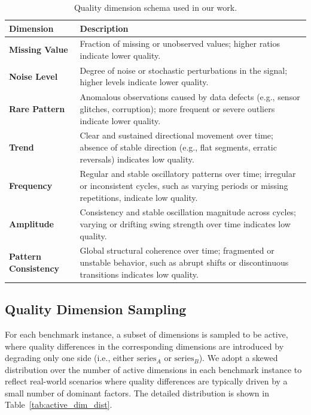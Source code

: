 \documentclass{article}
\begin{document}
\begin{table}[htbp!]
\centering
\caption{Quality dimension schema used in our work.}
\small
\setlength{\tabcolsep}{4pt}
\renewcommand{\arraystretch}{1.1}
\begin{tabular}{l p{10cm}}
\toprule
\textbf{Dimension} & \textbf{Description} \\
\midrule
\textbf{Missing Value} & Fraction of missing or unobserved values; higher ratios indicate lower quality. \\
\textbf{Noise Level} & Degree of noise or stochastic perturbations in the signal; higher levels indicate lower quality. \\
\textbf{Rare Pattern} & Anomalous observations caused by data defects (e.g., sensor glitches, corruption); more frequent or severe outliers indicate lower quality. \\
\textbf{Trend} & Clear and sustained directional movement over time; absence of stable direction (e.g., flat segments, erratic reversals) indicates low quality. \\
\textbf{Frequency} & Regular and stable oscillatory patterns over time; irregular or inconsistent cycles, such as varying periods or missing repetitions, indicate low quality. \\
\textbf{Amplitude} & Consistency and stable oscillation magnitude across cycles; varying or drifting swing strength over time indicates low quality. \\
\textbf{Pattern Consistency} & Global structural coherence over time; fragmented or unstable behavior, such as abrupt shifts or discontinuous transitions indicates low quality. \\
\bottomrule
\end{tabular}
\label{tab:quality_dimension}
\end{table}

\subsection{Quality Dimension Sampling}
\label{app:benchmark_dimension_sampling}

For each benchmark instance, a subset of dimensions is sampled to be active, where quality differences in the corresponding dimensions are introduced by degrading only one side (i.e., either $\mathrm{series}_A$ or $\mathrm{series}_B$).
We adopt a skewed distribution over the number of active dimensions in each benchmark instance to reflect real-world scenarios where quality differences are typically driven by a small number of dominant factors. The detailed distribution is shown in Table~\ref{tab:active_dim_dist}.
\end{document}
